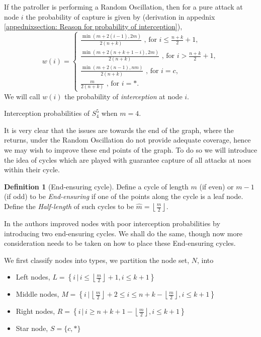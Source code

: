 \documentclass[a4paper,10pt]{article}
\newcommand{\floor}[1]{\left \lfloor #1 \right \rfloor}
\theoremstyle{definition}
\newtheorem{definition}[theorem]{Definition}
\theoremstyle{definition}
\theoremstyle{remark}
\theoremstyle{definition}
\begin{document}
If the patroller is performing a Random Oscillation, then for a pure attack at node $i$ the probability of capture is given by (derivation in appednix \ref{appednixsection: Reason for probability of interception}),
\begin{equation}
\label{eq:Prob of Interception}
w(i)= \left\{\begin{array}{l}
 \frac{\min(m+2(i-1),2m)}{2(n+k)} \text{  , for } i \leq \frac{n+k}{2} +1, \\
 \frac{\min(m+2(n+k+1-i),2m)}{2(n+k)} \text{  , for } i > \frac{n+k}{2} +1, \\
 \frac{\min(m+2(n-1),nm)}{2(n+k)} \text{  , for } i=c, \\
 \frac{m}{2(n+k)} \text{  , for } i=*. 
\end{array} \right.
\end{equation}
We will call $w(i)$ the probability of \textit{interception} at node $i$.


\begin{examplefigure}
\begin{center}

\end{center}
\caption{Interception probabilities of $S^5_{4}$ when $m=4$.}
\end{examplefigure}

It is very clear that the issues are towards the end of the graph, where the returns, under the Random Oscillation do not provide adequate coverage, hence we may wish to improve these end points of the graph. To do so we will introduce the idea of cycles which are played with guarantee capture of all attacks at noes within their cycle.

\begin{definition}[End-ensuring cycle]
Define a cycle of length $m$ (if even) or $m-1$ (if odd) to be \textit{End-ensuring} if one of the points along the cycle is a leaf node. Define the \textit{Half-length} of such cycles to be $\hat{m}=\floor{\frac{m}{2}}$.
\end{definition}

In \cite{Papadaki2016} the authors improved nodes with poor interception probabilities by introducing two end-ensuring cycles. We shall do the same, though now more consideration needs to be taken on how to place these End-ensuring cycles. 

We first classify nodes into types, we partition the node set, $N$, into 
\begin{itemize}
\item Left nodes, $L=\left\{ i \, | \, i \leq \floor{\frac{m}{2}}+1 , i \leq k+1 \right\}$ 
\item Middle nodes, $M=\left\{ i \, | \, \floor{\frac{m}{2}}+2 \leq i \leq n+k-\floor{\frac{m}{2}} , i \leq k+1 \right\}$
\item Right nodes, $R=\left\{ i \, | \, i \geq n+k+1-\floor{\frac{m}{2}} , i \leq k+1 \right\}$
\item Star node, $S=\{ c,* \}$
\end{itemize}
\end{document}
